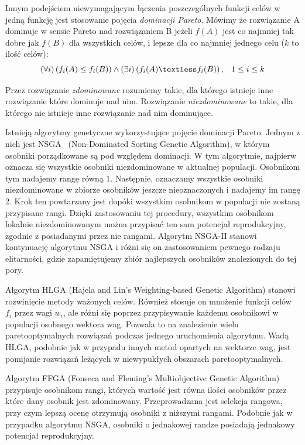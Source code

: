 \documentclass{xmgr}
\begin{document}
Innym podejściem niewymagającym łączenia poszczególnych funkcji celów w jedną funkcję jest stosowanie pojęcia \emph{dominacji Pareto}. Mówimy że rozwiązanie A dominuje w sensie Pareto nad rozwiązaniem B jeżeli $f(A)$ jest co najmniej tak dobre jak $f(B)$ dla wszystkich celów, i lepsze dla co najmniej jednego celu ($k$ to ilość celów):
$$ \left( \forall i \right) \left( f_i(A) \le f_i(B) \right) \wedge \left( \exists i \right) \left( f_i(A) \textless f_i(B) \right), \hspace{8pt} 1 \le i \le k $$

Przez rozwiązanie \emph{zdominowane} rozumiemy takie, dla którego istnieje inne rozwiązanie które dominuje nad nim. Rozwiązanie \emph{niezdominowane} to takie, dla którego nie istnieje inne rozwiązanie nad nim dominujące.

Istnieją algorytmy genetyczne wykorzystujące pojęcie dominacji Pareto. Jednym z nich jest NSGA~\cite{SrinivasDeb} (Non-Dominated Sorting Genetic Algorithm), w którym osobniki porządkowane są pod względem dominacji. W tym algorytmie, najpierw oznacza się wszystkie osobniki niezdominowane w aktualnej populacji. Osobnikom tym nadajemy rangę równą 1. Następnie, oznaczamy wszystkie osobniki niezdominowane w zbiorze osobników jeszcze nieoznaczonych i nadajemy im rangę 2. Krok ten powtarzany jest dopóki wszystkim osobnikom w populacji nie zostaną przypisane rangi. Dzięki zastosowaniu tej procedury, wszystkim osobnikom lokalnie niezdominowanym można przypisać ten sam potencjał reprodukcyjny, zgodnie z posiadanymi przez nie rangami. Algorytm NSGA-II stanowi kontynuację algorytmu NSGA i różni się on zastosowaniem pewnego rodzaju elitarności, gdzie zapamiętujemy zbiór najlepszych osobników znalezionych do tej pory.

Algorytm HLGA (Hajela and Lin's Weighting-based Genetic Algorithm) stanowi rozwinięcie metody ważonych celów. Również stosuje on mnożenie funkcji celów $f_i$ przez wagi $w_i$, ale różni się poprzez przypisywanie każdemu osobnikowi w populacji osobnego wektora wag. Pozwala to na znalezienie wielu paretooptymalnych rozwiązań podczas jednego uruchomienia algorytmu. Wadą HLGA, podobnie jak w przypadu innych metod opartych na wektorze wag, jest pomijanie rozwiązań leżących w niewypukłych obszarach paretooptymalnych.

Algorytm FFGA (Fonseca and Fleming's Multiobjective Genetic Algorithm) przypisuje osobnikom rangi, których wartość jest równa ilości osobników przez które dany osobnik jest zdominowany. Przeprowadzana jest selekcja rangowa, przy czym lepszą ocenę otrzymują osobniki z niższymi rangami. Podobnie jak w przypadku algorytmu NSGA, osobniki o jednakowej randze posiadają jednakowy potencjał reprodukcyjny.
\end{document}
